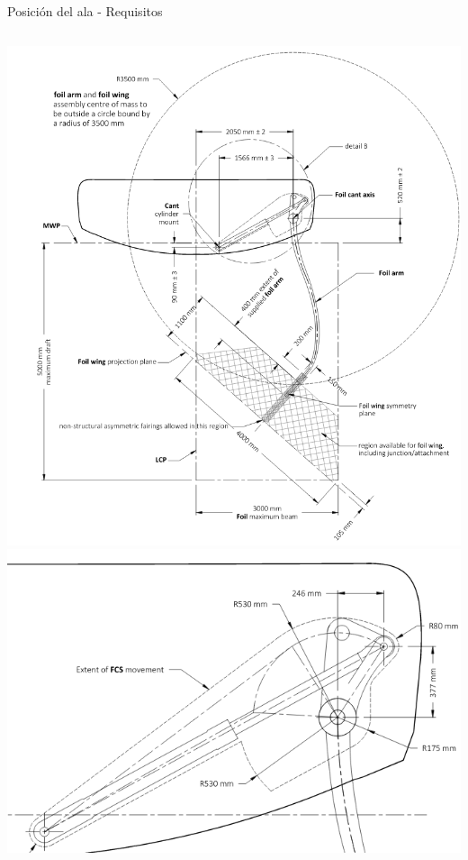 \documentclass[presentation,aspectratio=169]{beamer}
\begin{document}
\begin{frame}[label={sec:org9174ccf}]{Posición del ala - Requisitos}
\begin{columns}
\begin{column}{0.5\columnwidth}
\begin{center}
\includegraphics[height=0.6\textheight]{../../figures/ac75-class-foil.png}\\[-4mm]
\includegraphics[height=0.3\textheight]{../../figures/ac75-rule-detail.png}
\end{center}
\end{column}


\end{columns}
\end{frame}
\end{document}
